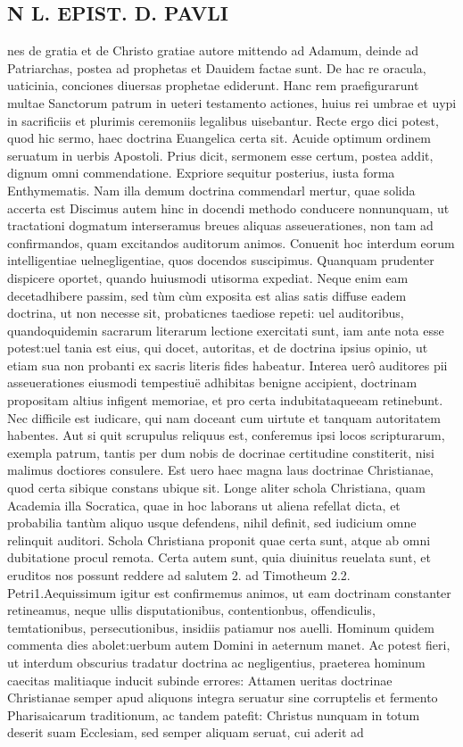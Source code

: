 \documentclass{article}
\begin{document}
\begin{pages}
\section*{N L. EPIST. D. PAVLI }
\marginpar{[ p.49 ]}\pstart nes de gratia et de Christo gratiae autore mittendo ad Adamum, deinde ad Patriarchas, postea ad prophetas et Dauidem factae sunt. De hac re oracula, uaticinia, conciones diuersas prophetae ediderunt. Hanc rem praefigurarunt multae Sanctorum patrum in ueteri testamento actiones, huius rei umbrae et uypi in sacrificiis et plurimis ceremoniis legalibus uisebantur. Recte ergo dici potest, quod hic sermo, haec doctrina Euangelica certa sit. Acuide optimum ordinem seruatum in uerbis Apostoli. Prius dicit, sermonem esse certum, postea addit, dignum omni commendatione. Expriore sequitur posterius, iusta forma Enthymematis. Nam illa demum doctrina commendarl mertur, quae solida accerta est  \pend\pstart Discimus autem hinc in docendi methodo conducere nonnunquam, ut tractationi dogmatum interseramus breues aliquas asseuerationes, non tam ad confirmandos, quam excitandos auditorum animos. Conuenit hoc interdum eorum intelligentiae uelnegligentiae, quos docendos suscipimus. Quanquam prudenter dispicere oportet, quando huiusmodi utisorma expediat. Neque enim eam decetadhibere passim, sed tùm cùm exposita est alias satis diffuse eadem doctrina, ut non necesse sit, probaticnes taediose repeti: uel auditoribus, quandoquidemin sacrarum literarum lectione exercitati sunt, iam ante nota esse potest:uel tania est eius, qui docet, autoritas, et de doctrina ipsius opinio, ut etiam sua non probanti ex sacris literis fides habeatur. Interea uerô auditores pii asseuerationes eiusmodi tempestiuë adhibitas benigne accipient, doctrinam propositam altius infigent memoriae, et pro certa indubitataqueeam retinebunt. Nec difficile est iudicare, qui nam doceant cum uirtute et tanquam autoritatem habentes. Aut si quit scrupulus reliquus est, conferemus ipsi locos scripturarum, exempla patrum, tantis per dum nobis de docrinae certitudine constiterit, nisi malimus doctiores consulere. Est uero haec magna laus doctrinae Christianae, quod certa sibique  constans ubique sit. Longe aliter schola Christiana, quam Academia illa Socratica, quae in hoc laborans ut aliena refellat dicta, et probabilia tantùm aliquo usque defendens, nihil definit, sed iudicium omne relinquit auditori. Schola Christiana proponit quae certa sunt, atque ab omni dubitatione procul remota. Certa autem sunt, quia diuinitus reuelata sunt, et eruditos nos possunt reddere ad salutem 2. ad Timotheum 2.2. Petri1.Aequissimum igitur est confirmemus animos, ut eam doctrinam constanter retineamus, neque ullis disputationibus, contentionbus, offendiculis, temtationibus, persecutionibus, insidiis patiamur nos auelli. Hominum quidem commenta dies abolet:uerbum autem Domini in aeternum manet. Ac potest fieri, ut interdum obscurius tradatur doctrina ac negligentius, praeterea hominum caecitas malitiaque  inducit subinde errores: Attamen ueritas doctrinae Christianae semper apud aliquons integra seruatur sine corruptelis et fermento Pharisaicarum traditionum, ac tandem patefit: Christus nunquam in totum deserit suam Ecclesiam, sed semper aliquam seruat, cui aderit ad 
\end{pages}
\end{document}
